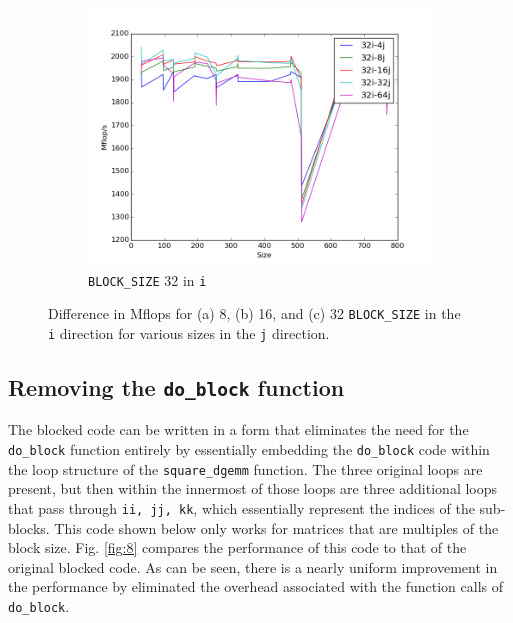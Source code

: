 \documentclass[10pt]{article}
\begin{document}
\begin{figure}[H]
\begin{subfigure}[b]{0.35\textwidth}
        \centering
        \includegraphics[width=\textwidth]{figures/32i-64j.png}
        \caption{{\tt BLOCK\_SIZE} 32 in {\tt i}}
        \end{subfigure}%
        \caption{Difference in Mflops for (a) 8, (b) 16, and (c) 32 {\tt BLOCK\_SIZE} in the {\tt i} direction for various sizes in the {\tt j} direction.}
        \label{fig:5}
\end{figure}

\subsection{Removing the {\tt do\_block} function}

The blocked code can be written in a form that eliminates the need for the {\tt do\_block} function entirely by essentially embedding the {\tt do\_block} code within the loop structure of the {\tt square\_dgemm} function. The three original loops are present, but then within the innermost of those loops are three additional loops that pass through {\tt ii, jj, kk}, which essentially represent the indices of the sub-blocks. This code shown below only works for matrices that are multiples of the block size. Fig. \ref{fig:8} compares the performance of this code to that of the original blocked code. As can be seen, there is a nearly uniform improvement in the performance by eliminated the overhead associated with the function calls of {\tt do\_block}.
\end{document}
